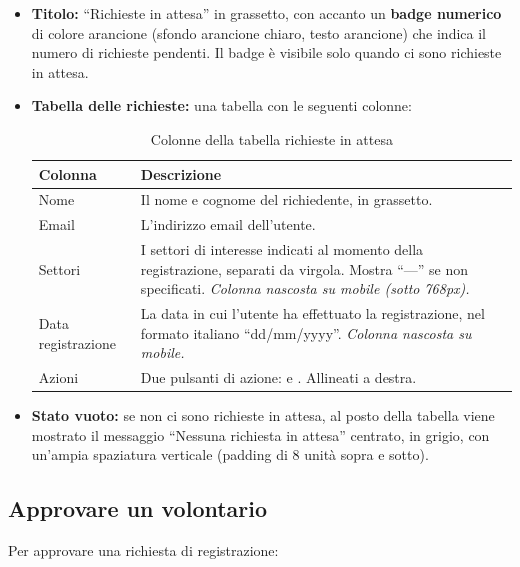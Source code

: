 \documentclass[a4paper,11pt,oneside]{book}
\newcommand{\pulsante}[1]{\fcolorbox{namoCharcoal}{namoGray}{\small\textsf{\textbf{#1}}}}
\begin{document}
\begin{itemize}[leftmargin=1.5em]
  \item \textbf{Titolo:} ``Richieste in attesa'' in grassetto, con accanto un \textbf{badge numerico} di colore \textcolor{namoOrange}{arancione} (sfondo arancione chiaro, testo arancione) che indica il numero di richieste pendenti. Il badge \`e visibile solo quando ci sono richieste in attesa.

  \item \textbf{Tabella delle richieste:} una tabella con le seguenti colonne:

    \begin{table}[htbp]
    \centering
    \caption{Colonne della tabella richieste in attesa}
    \label{tab:colonne-richieste-attesa}
    \begin{tabularx}{\textwidth}{l X}
    \toprule
    \textbf{Colonna} & \textbf{Descrizione} \\
    \midrule
    Nome              & Il nome e cognome del richiedente, in grassetto. \\
    Email             & L'indirizzo email dell'utente. \\
    Settori           & I settori di interesse indicati al momento della registrazione, separati da virgola. Mostra ``---'' se non specificati. \textit{Colonna nascosta su mobile (sotto 768px).} \\
    Data registrazione & La data in cui l'utente ha effettuato la registrazione, nel formato italiano ``dd/mm/yyyy''. \textit{Colonna nascosta su mobile.} \\
    Azioni            & Due pulsanti di azione: \pulsante{Approva} e \pulsante{Rifiuta}. Allineati a destra. \\
    \bottomrule
    \end{tabularx}
    \end{table}

  \item \textbf{Stato vuoto:} se non ci sono richieste in attesa, al posto della tabella viene mostrato il messaggio ``Nessuna richiesta in attesa'' centrato, in grigio, con un'ampia spaziatura verticale (padding di 8 unit\`a sopra e sotto).
\end{itemize}

\subsection{Approvare un volontario}

Per approvare una richiesta di registrazione:
\end{document}
